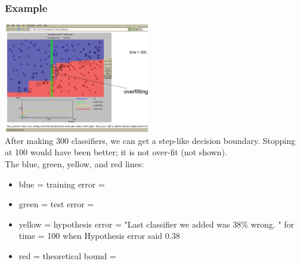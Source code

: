 \subsubsection{Example}
\includegraphics[width=2.5in]{figures/bagging_example.pdf}  \hfill \\
After making 300 classifiers, we can get a step-like decision boundary.  
Stopping at 100 would have been better; it is not over-fit (not shown).  \hfill \\

The blue, green, yellow, and red lines:   %
\begin{itemize}
	\item blue = training error = 
	\item green = test error = 
	\item yellow = hypothesis error = "Last classifier we added was 38\% wrong. " 
		for time = 100 when Hypothesis error said 0.38
	\item red = theoretical bound = 
\end{itemize}


